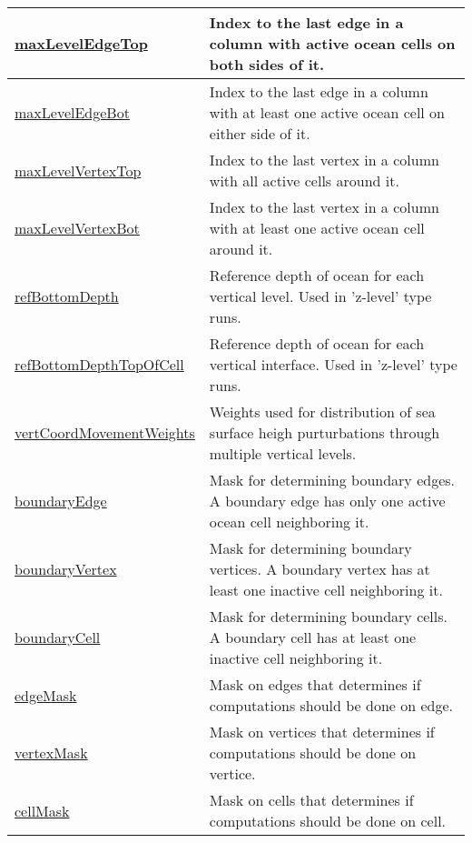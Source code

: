 {\begin{center}
\begin{longtable}{| p{2.0in} | p{4.0in} |}
    \hline
    \hyperref[subsec:var_sec_mesh_maxLevelEdgeTop]{maxLevelEdgeTop} & Index to the last edge in a column with active ocean cells on both sides of it. \\
    \hline
    \hyperref[subsec:var_sec_mesh_maxLevelEdgeBot]{maxLevelEdgeBot} & Index to the last edge in a column with at least one active ocean cell on either side of it. \\
    \hline
    \hyperref[subsec:var_sec_mesh_maxLevelVertexTop]{maxLevelVertexTop} & Index to the last vertex in a column with all active cells around it. \\
    \hline
    \hyperref[subsec:var_sec_mesh_maxLevelVertexBot]{maxLevelVertexBot} & Index to the last vertex in a column with at least one active ocean cell around it. \\
    \hline
    \hyperref[subsec:var_sec_mesh_refBottomDepth]{refBottomDepth} & Reference depth of ocean for each vertical level. Used in 'z-level' type runs. \\
    \hline
    \hyperref[subsec:var_sec_mesh_refBottomDepthTopOfCell]{refBottomDepthTopOfCell} & Reference depth of ocean for each vertical interface. Used in 'z-level' type runs. \\
    \hline
    \hyperref[subsec:var_sec_mesh_vertCoordMovementWeights]{vertCoordMovementWeights} & Weights used for distribution of sea surface heigh purturbations through multiple vertical levels. \\
    \hline
    \hyperref[subsec:var_sec_mesh_boundaryEdge]{boundaryEdge} & Mask for determining boundary edges. A boundary edge has only one active ocean cell neighboring it. \\
    \hline
    \hyperref[subsec:var_sec_mesh_boundaryVertex]{boundaryVertex} & Mask for determining boundary vertices. A boundary vertex has at least one inactive cell neighboring it. \\
    \hline
    \hyperref[subsec:var_sec_mesh_boundaryCell]{boundaryCell} & Mask for determining boundary cells. A boundary cell has at least one inactive cell neighboring it. \\
    \hline
    \hyperref[subsec:var_sec_mesh_edgeMask]{edgeMask} & Mask on edges that determines if computations should be done on edge. \\
    \hline
    \hyperref[subsec:var_sec_mesh_vertexMask]{vertexMask} & Mask on vertices that determines if computations should be done on vertice. \\
    \hline
    \hyperref[subsec:var_sec_mesh_cellMask]{cellMask} & Mask on cells that determines if computations should be done on cell. \\

\end{longtable}
\end{center}}
